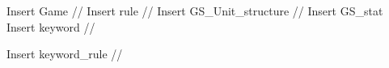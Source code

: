 Insert Game //
Insert rule //
Insert GS_Unit_structure //
Insert GS_stat
Insert keyword //

Insert keyword_rule //
